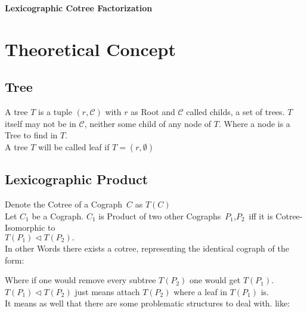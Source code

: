 \documentclass[a4paper,12pt]{article}
\newcommand{\Uebungsblatt}{Lexicographic Cotree Factorization}
\begin{document}
	\thispagestyle{fancy}
	\pagestyle{fancy}
	\begin{center}
		\LARGE \sf \textbf{ \Uebungsblatt{}}
	\end{center}
	\vspace*{0.1cm}
	\tableofcontents
	\newpage
	\thispagestyle{fancy}
	\section{Theoretical Concept}
	\subsection{Tree}
	A tree $T$ is a tuple $(r,\mathcal{C})$ with $r$ as Root and $\mathcal{C}$ called childs, a set of trees. $T$ itself may not be in $\mathcal{C}$, neither some child of any node of $T$. Where a node is a Tree to find in $T$.  \\
	A tree $T$ will be called leaf if $T=(r,\emptyset)$
	\subsection{Lexicographic Product}
	Denote the Cotree of a Cograph $\,C$ as $T(C)$\\
	Let $C_1$ be a Cograph. $C_1$ is Product of two other Cographs $\,P_1$,$P_2\,$ iff  it is Cotree-Isomorphic to \\$T(P_1)\vartriangleleft T(P_2).$\\
	In other Words there exists a cotree, representing the identical cograph of the form:
		\begin{center}
	\end{center}
	Where if one would remove every subtree $T(P_2)$ one would get $T(P_1)$.\\
	$T(P_1)\vartriangleleft T(P_2)$ just means attach $T(P_2)$ where a leaf in $T(P_1)$ is.\\
	It means as well that there are some problematic structures to deal with.
	like:\\
	
\end{document}
